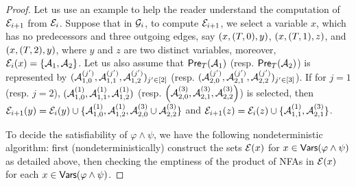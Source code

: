 \begin{proof}
Let us use an example to help the reader understand the computation of $\mathcal{E}_{i+1}$ from $\mathcal{E}_i$.  Suppose that in $\mathcal{G}_i$, to compute $\mathcal{E}_{i+1}$, we select a variable $x$, which has no predecessors and three outgoing edges, say $(x, (T, 0), y)$, $(x, (T, 1), z)$, and $(x, (T, 2), y)$, where $y$ and $z$ are two distinct variables, moreover, $\mathcal{E}_i(x) = \{\mathcal{A}_1, \mathcal{A}_2\}$. Let us also assume that  $\textsf{Pre}_{T}(\mathcal{A}_1)$ (resp. $\textsf{Pre}_{T}(\mathcal{A}_2)$) is represented by $(\mathcal{A}^{(j')}_{1, 0}, \mathcal{A}^{(j')}_{1, 1}, \mathcal{A}^{(j')}_{1, 2})_{ j'  \in [2]}$ (resp. $(\mathcal{A}^{(j')}_{2, 0}, \mathcal{A}^{(j')}_{2, 1}, \mathcal{A}^{(j')}_{2, 2})_{ j'  \in [3]}$). If for $j = 1$ (resp. $j=2$), $(\mathcal{A}^{(1)}_{1, 0}, \mathcal{A}^{(1)}_{1, 1}, \mathcal{A}^{(1)}_{1, 2})$  (resp. $\left(\mathcal{A}^{(3)}_{2, 0}, \mathcal{A}^{(3)}_{2, 1}, \mathcal{A}^{(3)}_{2, 2}\right)$)  is selected, then $\mathcal{E}_{i+1}(y) = \mathcal{E}_i(y) \cup \{\mathcal{A}^{(1)}_{1, 0}, \mathcal{A}^{(1)}_{1, 2}, \mathcal{A}^{(3)}_{2, 0} \cup \mathcal{A}^{(3)}_{2, 2}\}$ and $\mathcal{E}_{i+1}(z) = \mathcal{E}_{i}(z) \cup \{\mathcal{A}^{(1)}_{1, 1}, \mathcal{A}^{(3)}_{2, 1}\}$. 

To decide the satisfiability of $\varphi \wedge \psi$, we have the following nondeterministic algorithm: first (nondeterministically) construct the sets $\mathcal{E}(x)$ for $x \in \mathsf{Vars}(\varphi \wedge \psi)$ as detailed above, then 
checking the emptiness of the product of NFAs in $\mathcal{E}(x)$ for each $x \in \mathsf{Vars}(\varphi \wedge \psi)$.


\end{proof}
